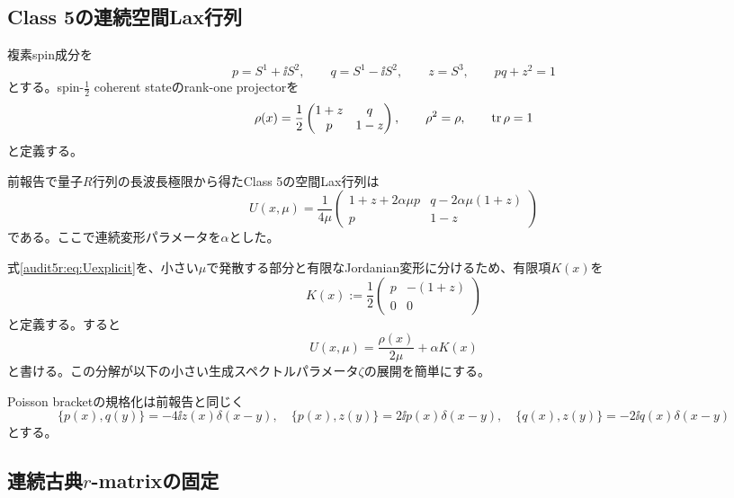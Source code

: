 \subsection{Class 5の連続空間Lax行列}

複素spin成分を
\begin{equation}
p=S^1+\ii S^2,\qquad q=S^1-\ii S^2,\qquad z=S^3,
\qquad pq+z^2=1
\label{audit5r:eq:spinconstraint}
\end{equation}
とする。spin-$\tfrac12$ coherent stateのrank-one projectorを
\begin{equation}
\rho(x)=\frac12
\begin{pmatrix}
1+z&q\\
p&1-z
\end{pmatrix},
\qquad
\rho^2=\rho,
\qquad
\operatorname{tr}\rho=1
\label{audit5r:eq:rho}
\end{equation}
と定義する。

前報告で量子$R$行列の長波長極限から得たClass 5の空間Lax行列は
\begin{equation}
U(x,\mu)
=
\frac{1}{4\mu}
\begin{pmatrix}
1+z+2\alpha\mu p&q-2\alpha\mu(1+z)\\
p&1-z
\end{pmatrix}
\label{audit5r:eq:Uexplicit}
\end{equation}
である。ここで連続変形パラメータを$\alpha$とした。

式\eqref{audit5r:eq:Uexplicit}を、小さい$\mu$で発散する部分と有限なJordanian変形に分けるため、有限項$K(x)$を
\begin{equation}
K(x)
:=\frac12
\begin{pmatrix}
p&-(1+z)\\0&0\end{pmatrix}
\label{audit5r:eq:K}
\end{equation}
と定義する。すると
\begin{equation}
U(x,\mu)=\frac{\rho(x)}{2\mu}+\alpha K(x)
\label{audit5r:eq:UK}
\end{equation}
と書ける。この分解が以下の小さい生成スペクトルパラメータ$\zeta$の展開を簡単にする。

Poisson bracketの規格化は前報告と同じく
\begin{equation}
\{p(x),q(y)\}=-4\ii z(x)\delta(x-y),\quad
\{p(x),z(y)\}=2\ii p(x)\delta(x-y),\quad
\{q(x),z(y)\}=-2\ii q(x)\delta(x-y)
\label{audit5r:eq:PBpqz}
\end{equation}
とする。

\subsection{連続古典$r$-matrixの固定}


